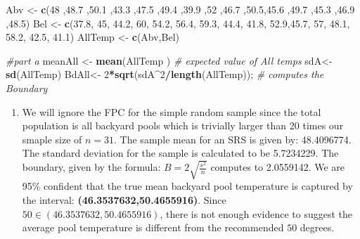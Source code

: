 \documentclass[
]{article}
\newenvironment{Shaded}{\begin{snugshade}}{\end{snugshade}}
\newcommand{\CommentTok}[1]{\textcolor[rgb]{0.56,0.35,0.01}{\textit{#1}}}
\newcommand{\DecValTok}[1]{\textcolor[rgb]{0.00,0.00,0.81}{#1}}
\newcommand{\FloatTok}[1]{\textcolor[rgb]{0.00,0.00,0.81}{#1}}
\newcommand{\KeywordTok}[1]{\textcolor[rgb]{0.13,0.29,0.53}{\textbf{#1}}}
\newcommand{\NormalTok}[1]{#1}
\newcommand{\OperatorTok}[1]{\textcolor[rgb]{0.81,0.36,0.00}{\textbf{#1}}}
\newcommand{\StringTok}[1]{\textcolor[rgb]{0.31,0.60,0.02}{#1}}
\providecommand{\tightlist}{%
  \setlength{\itemsep}{0pt}\setlength{\parskip}{0pt}}
\begin{document}
\begin{Shaded}
\begin{Highlighting}[]
\NormalTok{Abv <-}\StringTok{  }\KeywordTok{c}\NormalTok{(}\DecValTok{48}\NormalTok{ ,}\FloatTok{48.7}\NormalTok{ ,}\FloatTok{50.1}\NormalTok{ ,}\FloatTok{43.3}\NormalTok{ ,}\FloatTok{47.5}\NormalTok{ ,}\FloatTok{49.4}\NormalTok{ ,}\FloatTok{39.9}\NormalTok{ ,}\DecValTok{52}\NormalTok{ ,}\FloatTok{46.7}\NormalTok{ ,}\FloatTok{50.5}\NormalTok{,}\FloatTok{45.6}\NormalTok{ ,}\FloatTok{49.7}\NormalTok{ ,}\FloatTok{45.3}\NormalTok{ ,}\FloatTok{46.9}\NormalTok{ ,}\FloatTok{48.5}\NormalTok{)}
\NormalTok{Bel <-}\StringTok{ }\KeywordTok{c}\NormalTok{(}\FloatTok{37.8}\NormalTok{, }\DecValTok{45}\NormalTok{, }\FloatTok{44.2}\NormalTok{, }\DecValTok{60}\NormalTok{, }\FloatTok{54.2}\NormalTok{, }\FloatTok{56.4}\NormalTok{, }\FloatTok{59.3}\NormalTok{, }\FloatTok{44.4}\NormalTok{, }\FloatTok{41.8}\NormalTok{, }\FloatTok{52.9}\NormalTok{,}\FloatTok{45.7}\NormalTok{, }\DecValTok{57}\NormalTok{, }\FloatTok{48.1}\NormalTok{, }\FloatTok{58.2}\NormalTok{, }\FloatTok{42.5}\NormalTok{, }\FloatTok{41.1}\NormalTok{)}
\NormalTok{AllTemp <-}\StringTok{ }\KeywordTok{c}\NormalTok{(Abv,Bel)}

\CommentTok{#part a}
\NormalTok{meanAll <-}\StringTok{ }\KeywordTok{mean}\NormalTok{(AllTemp ) }\CommentTok{# expected value of All temps }
\NormalTok{sdA<-}\StringTok{ }\KeywordTok{sd}\NormalTok{(AllTemp)}
\NormalTok{BdAll<-}\StringTok{ }\DecValTok{2}\OperatorTok{*}\KeywordTok{sqrt}\NormalTok{(sdA}\OperatorTok{^}\DecValTok{2}\OperatorTok{/}\KeywordTok{length}\NormalTok{(AllTemp)); }\CommentTok{# computes the Boundary}
\end{Highlighting}
\end{Shaded}

\begin{enumerate}
\def\labelenumi{\alph{enumi}.}
\tightlist
\item
  We will ignore the FPC for the simple random sample since the total
  population is all backyard pools which is trivially larger than 20
  times our smaple size of \(n=31\). The sample mean for an SRS is given
  by: 48.4096774. The standard deviation for the sample is calculated to
  be 5.7234229. The boundary, given by the formula:
  \(B = 2\sqrt{\frac{s^2}{n}}\) computes to 2.0559142. We are 95\%
  confident that the true mean backyard pool temperature is captured by
  the interval: \textbf{(46.3537632,50.4655916)}. Since
  \(50\in (46.3537632,50.4655916)\), there is not enough evidence to
  suggest the average pool temperature is different from the recommended
  \(50\) degrees.
\end{enumerate}
\end{document}

